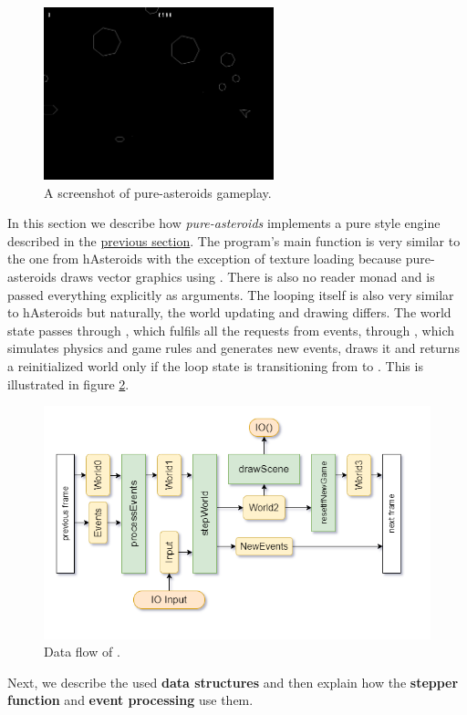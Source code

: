 \documentclass[
  digital, %
  color,   %
  table,   %
  oneside, %
  lof,     %
  lot,     %
]{fithesis3}
\begin{document}
\begin{figure}[hbt!]
    \centering
    \includegraphics[height=5cm]{images/pure-screenshot.png}
    \caption{A screenshot of pure-asteroids gameplay.}
    \label{fig:pureasteroidsscreenshot}
\end{figure}

In this section we describe how \emph{pure-asteroids} implements a pure style engine described
in the \hyperref[sect:pureengines]{previous section}.
The program's main function is very similar to the one from
hAsteroids with the exception of texture loading because pure-asteroids
draws vector graphics using . There is also no reader monad
and  is passed everything explicitly as arguments.
The looping itself is also very similar to hAsteroids but naturally,
the world updating and drawing differs. The world state passes through
, which fulfils all the requests from events,
through , which simulates physics and game rules and generates new events,
 draws it and  returns a reinitialized
world only if the loop state is transitioning from  to .
This is illustrated in figure \ref{fig:worldeventsflow}.
\begin{figure}
    \centering
    \includegraphics[width=\textwidth]{images/world-flow-detailed.png}
    \caption{Data flow of .}
    \label{fig:worldeventsflow}
\end{figure}
Next, we describe the used \textbf{data structures} and then explain
how the \textbf{stepper function} and \textbf{event processing} use them.
\end{document}
